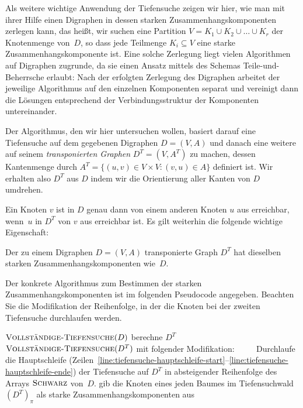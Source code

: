 \begin{bem}
Als weitere wichtige Anwendung der Tiefensuche zeigen wir hier, wie man mit ihrer Hilfe einen Digraphen in dessen starken Zusammenhangskomponenten zerlegen kann, das heißt, wir suchen eine Partition $V = K_1 \cup K_2 \cup \ldots \cup K_r$ der Knotenmenge von~$D$, so dass jede Teilmenge $K_i \subseteq V$ eine starke Zusammenhangskomponente ist.
Eine solche Zerlegung liegt vielen Algorithmen auf Digraphen zugrunde, da sie einen Ansatz mittels des Schemas Teile-und-Beherrsche erlaubt:
Nach der erfolgten Zerlegung des Digraphen arbeitet der jeweilige Algorithmus auf den einzelnen Komponenten separat und vereinigt dann die Lösungen entsprechend der Verbindungsstruktur der Komponenten untereinander.

Der Algorithmus, den wir hier untersuchen wollen, basiert darauf eine Tiefensuche auf dem gegebenen Digraphen $D=(V,A)$ und danach eine weitere auf seinem \emph{transponierten Graphen} $D^T = (V,A^T)$ zu machen, dessen Kantenmenge durch $A^T = \{(u,v) \in V \times V : (v,u) \in A\}$ definiert ist.
Wir erhalten also $D^T$ aus $D$ indem wir die Orientierung aller Kanten von $D$ umdrehen.

Ein Knoten $v$ ist in $D$ genau dann von einem anderen Knoten $u$ aus erreichbar, wenn~$u$ in $D^T$ von $v$ aus erreichbar ist.
Es gilt weiterhin die folgende wichtige Eigenschaft:
\end{bem} 

\begin{prop}
\label{beob:d-vs-dt}
Der zu einem Digraphen $D=(V,A)$ transponierte Graph $D^T$ hat dieselben starken Zusammenhangskomponenten wie~$D$.
\end{prop}

\begin{bem} 
Der konkrete Algorithmus zum Bestimmen der starken Zusammenhangskomponenten ist im folgenden Pseudocode angegeben.
Beachten Sie die Modifikation der Reihenfolge, in der die Knoten bei der zweiten Tiefensuche durchlaufen werden.

\begin{algorithm}[H]
\caption{$\cc{Starke-Zusammenhangskomponenten}(D)$}
 \begin{algorithmic}[1]
  \STATE\label{line:szhk0} $\mathop{\text{\textsc{Vollständige-Tiefensuche}}}(D)$
  \STATE berechne $D^T$
  \STATE\label{line:szhk1} $\mathop{\text{\textsc{Vollständige-Tiefensuche}}}(D^T)$ mit folgender Modifikation:
  \STATE\label{line:szhk2} $\qquad$ Durchlaufe die Hauptschleife (Zeilen~\ref{line:tiefensuche-hauptschleife-start}--\ref{line:tiefensuche-hauptschleife-ende}) der Tiefensuche auf $D^T$ in absteigender Reihenfolge des Arrays $\mathop{\text{\textsc{Schwarz}}}$ von~$D$.
  \STATE gib die Knoten eines jeden Baumes im Tiefensuchwald $(D^T)_\pi$ als starke Zusammenhangskomponenten aus
 \end{algorithmic}
\end{algorithm}
\end{bem} 

